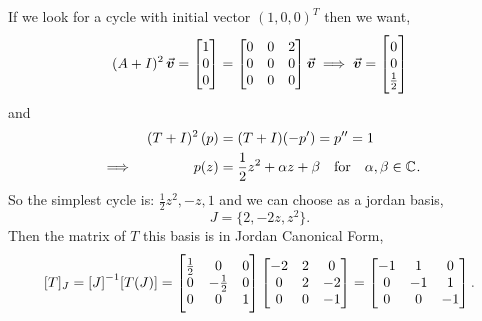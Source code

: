 \documentclass[../MathsNotesBase.tex]{subfiles}
\begin{document}
\begin{exe}
{			If we look for a cycle with initial vector $(1,0,0)^T$ then we want,
			\[ (A + I)^2\,\vec{\bm{v}} = \begin{bmatrix}1\\0\\0\end{bmatrix} = 
				\begin{bmatrix}
					0 & 0 & 2\\
					0 & 0 & 0\\
					0 & 0 & 0
				\end{bmatrix}\vec{\bm{v}} \implies
				\vec{\bm{v}} = \begin{bmatrix}0\\0\\\frac{1}{2}\end{bmatrix}
			\]
			and
			\[\begin{aligned}
				&& (T + I)^2\,(p) &= (T + I)(-p') = p'' = 1 \\
				&\implies & p(z) &= \frac{1}{2}z^2 + \alpha z + \beta \hspace{10pt}\text{for}\hspace{10pt} \alpha,\beta \in \mathbb{C}^{}.
			\end{aligned}\]
			So the simplest cycle is: ${ \frac{1}{2}z^2, -z, 1 }$ and we can choose as a jordan basis,
			\[ J = \{ 2, -2z, z^2 \}. \]
			Then the matrix of $T$ \wrt this basis is in Jordan Canonical Form,
			\[ [T]_J = {[J]}^{-1}[T(J)] = 	
				\begin{bmatrix}
					\frac{1}{2} & 0 & 0\\
					0 & -\frac{1}{2} & 0\\
					0 & 0 & 1
				\end{bmatrix}
				\begin{bmatrix}
					-2 & 2 & 0\\
					0 & 2 & -2\\
					0 & 0 & -1
				\end{bmatrix} =
				\begin{bmatrix}
					-1 & 1 & 0\\
					0 & -1 & 1\\
					0 & 0 & -1
				\end{bmatrix}.
			\]
		}
	\end{exe}






\end{document}
